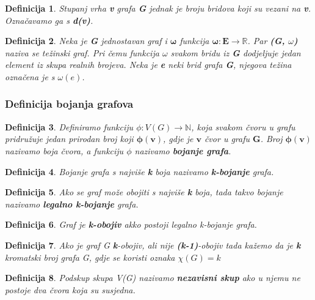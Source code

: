 \documentclass[times, utf8, diplomski, numeric]{fer}
\newtheorem{definition}{Definicija}
\begin{document}
\begin{definition}
Stupanj vrha \textbf{v} grafa \textbf{G} jednak je broju bridova koji su vezani na \textbf{v}. Označavamo ga s \textbf{d(v)}.
\end{definition}

\begin{definition}
Neka je \textbf{G} jednostavan graf i $\mathbf{\omega}$ funkcija $\mathbf{\omega : E \rightarrow \mathbb{R}}$. Par \textbf{(G, $\omega$)} naziva se težinski graf. Pri čemu funkcija $\omega$ svakom bridu iz \textbf{G} dodjeljuje jedan element iz skupa realnih brojeva. Neka je \textbf{e} neki brid grafa \textbf{G}, njegova težina označena je s $\omega(\mathbf{\mathit{e}})$.	 
\end{definition}


\subsubsection{Definicija bojanja grafova}

\begin{definition}
Definiramo funkciju $\phi : V(G) \rightarrow \mathbb{N}$, koja svakom čvoru u grafu pridružuje jedan prirodan broj koji $\mathbf{\phi(v)}$, gdje je $\mathbf{v}$ čvor u grafu $\mathbf{G}$. Broj $\mathbf{\phi(v)}$ nazivamo boja čvora, a funkciju $\phi$ nazivamo \textbf{bojanje grafa}. 
\end{definition}

\begin{definition}
Bojanje grafa s najviše \textbf{k} boja nazivamo \textbf{k-bojanje} grafa. 
\end{definition}

\begin{definition}
Ako se graf može obojiti s najviše \textbf{k} boja, tada takvo bojanje nazivamo \textbf{legalno k-bojanje} grafa. 
\end{definition}

\begin{definition}
Graf je \textbf{k-obojiv} akko postoji legalno k-bojanje grafa.
\end{definition}


\begin{definition}
Ako je graf G \textbf{k}-obojiv, ali nije \textbf{(k-1)}-obojiv tada kažemo da je \textbf{k} kromatski broj grafa G, gdje se koristi oznaka $\chi(G)=k$  
\end{definition}


\begin{definition}
Podskup skupa V(G) nazivamo \textbf{nezavisni skup} ako u njemu ne postoje dva čvora koja su susjedna.  
\end{definition}
\end{document}
